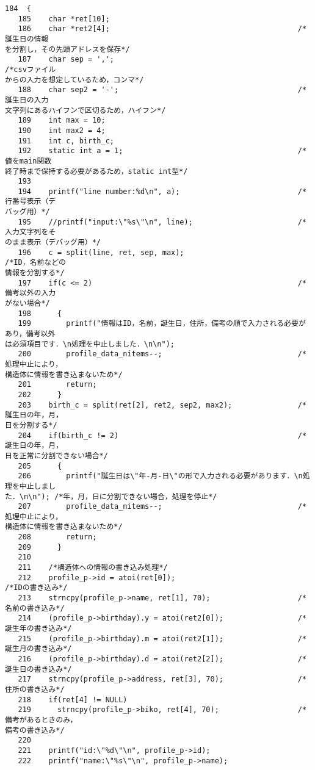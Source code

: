 \begin{Verbatim}[fontsize=\small, baselinestretch=0.8]
   184	{
   185	  char *ret[10];
   186	  char *ret2[4];                                           /*誕生日の情報
を分割し，その先頭アドレスを保存*/
   187	  char sep = ',';                                          /*csvファイル
からの入力を想定しているため，コンマ*/
   188	  char sep2 = '-';                                         /*誕生日の入力
文字列にあるハイフンで区切るため，ハイフン*/
   189	  int max = 10;
   190	  int max2 = 4;
   191	  int c, birth_c;
   192	  static int a = 1;                                        /*値をmain関数
終了時まで保持する必要があるため，static int型*/
   193	  
   194	  printf("line number:%d\n", a);                           /*行番号表示（デ
バッグ用）*/
   195	  //printf("input:\"%s\"\n", line);                        /*入力文字列をそ
のまま表示（デバッグ用）*/
   196	  c = split(line, ret, sep, max);                          /*ID，名前などの
情報を分割する*/
   197	  if(c <= 2)                                               /*備考以外の入力
がない場合*/
   198	    {
   199	      printf("情報はID，名前，誕生日，住所，備考の順で入力される必要があり，備考以外
は必須項目です．\n処理を中止しました．\n\n");
   200	      profile_data_nitems--;                               /*処理中止により，
構造体に情報を書き込まないため*/
   201	      return;
   202	    }
   203	  birth_c = split(ret[2], ret2, sep2, max2);               /*誕生日の年，月，
日を分割する*/
   204	  if(birth_c != 2)                                         /*誕生日の年，月，
日を正常に分割できない場合*/
   205	    {
   206	      printf("誕生日は\"年-月-日\"の形で入力される必要があります．\n処理を中止しまし
た．\n\n"); /*年，月，日に分割できない場合，処理を停止*/
   207	      profile_data_nitems--;                               /*処理中止により，
構造体に情報を書き込まないため*/
   208	      return;
   209	    }
   210	
   211	  /*構造体への情報の書き込み処理*/
   212	  profile_p->id = atoi(ret[0]);                            /*IDの書き込み*/
   213	  strncpy(profile_p->name, ret[1], 70);                    /*名前の書き込み*/
   214	  (profile_p->birthday).y = atoi(ret2[0]);                 /*誕生年の書き込み*/
   215	  (profile_p->birthday).m = atoi(ret2[1]);                 /*誕生月の書き込み*/
   216	  (profile_p->birthday).d = atoi(ret2[2]);                 /*誕生日の書き込み*/
   217	  strncpy(profile_p->address, ret[3], 70);                 /*住所の書き込み*/
   218	  if(ret[4] != NULL)
   219	    strncpy(profile_p->biko, ret[4], 70);                  /*備考があるときのみ，
備考の書き込み*/
   220	
   221	  printf("id:\"%d\"\n", profile_p->id);
   222	  printf("name:\"%s\"\n", profile_p->name);

\end{Verbatim}

